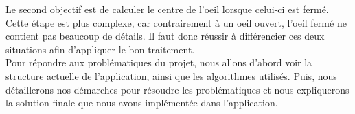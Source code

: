 Le second objectif est de calculer le centre de l'oeil lorsque celui-ci est fermé. Cette étape est plus complexe,
car contrairement à un oeil ouvert, l'oeil fermé ne contient pas beaucoup de détails. Il faut donc réussir à différencier ces
deux situations afin d'appliquer le bon traitement.\\ 

Pour répondre aux problématiques du projet, nous allons d'abord voir la structure actuelle de l'application, ainsi que les algorithmes
utilisés. Puis, nous détaillerons nos démarches pour résoudre les problématiques et nous expliquerons la solution finale que nous avons
implémentée dans l'application.

\newpage
